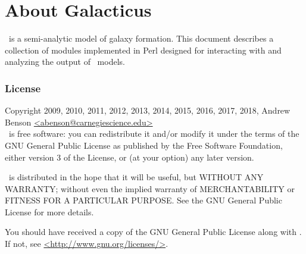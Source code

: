 \chapter{About Galacticus}

\glc\ is a semi-analytic model of galaxy formation. This document describes a collection of modules implemented in Perl designed for interacting with and analyzing the output of \glc\ models.

\subsection{License}

Copyright 2009, 2010, 2011, 2012, 2013, 2014, 2015, 2016, 2017, 2018, Andrew Benson \href{mailto:abenson@carnegiescience.edu}{\normalfont \ttfamily <abenson@carnegiescience.edu>}\\

\glc\ is free software: you can redistribute it and/or modify
it under the terms of the GNU General Public License as published by
the Free Software Foundation, either version 3 of the License, or
(at your option) any later version.

\glc\ is distributed in the hope that it will be useful,
but WITHOUT ANY WARRANTY; without even the implied warranty of
MERCHANTABILITY or FITNESS FOR A PARTICULAR PURPOSE.  See the
GNU General Public License for more details.

You should have received a copy of the GNU General Public License
along with \glc.  If not, see \href{http://www.gnu.org/licenses/}{\normalfont \ttfamily <http://www.gnu.org/licenses/>}.
